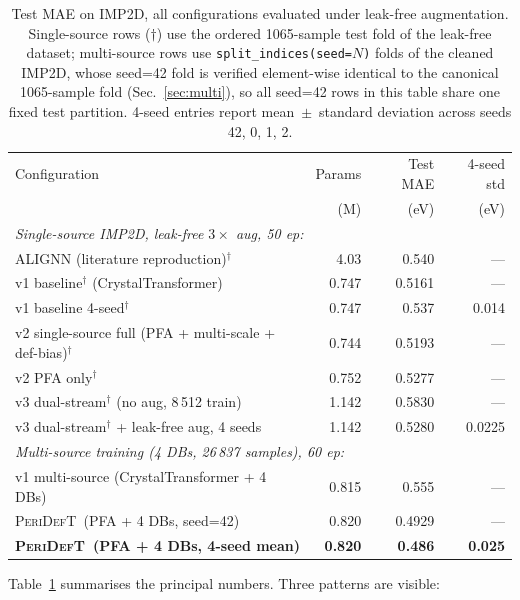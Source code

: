 \documentclass[11pt,a4paper]{article}
\newcommand{\modelname}{\textsc{PeriDefT}}
\begin{document}
\begin{table}[t]
\centering
\caption{Test MAE on IMP2D, all configurations evaluated under
leak-free augmentation. Single-source rows ($\dagger$) use the
ordered 1065-sample test fold of the leak-free dataset; multi-source
rows use \texttt{split\_indices(seed=$N$)} folds of the cleaned
IMP2D, whose seed=42 fold is verified element-wise identical to the
canonical 1065-sample fold (Sec.~\ref{sec:multi}), so all seed=42
rows in this table share one fixed test partition. 4-seed entries
report mean~$\pm$~standard deviation across seeds 42, 0, 1, 2.}
\label{tab:headline}
\begin{tabular}{lrrr}
\toprule
Configuration & Params & Test MAE & 4-seed std \\
& (M) & (eV) & (eV) \\
\midrule
\multicolumn{4}{l}{\emph{Single-source IMP2D, leak-free $3\times$ aug, 50 ep:}} \\
ALIGNN (literature reproduction)$^\dagger$
                    & 4.03 & 0.540 & --- \\
v1 baseline$^\dagger$ (CrystalTransformer)
                    & 0.747 & 0.5161 & --- \\
v1 baseline 4-seed$^\dagger$
                    & 0.747 & 0.537 & 0.014 \\
v2 single-source full (PFA + multi-scale + def-bias)$^\dagger$
                    & 0.744 & 0.5193 & --- \\
v2 PFA only$^\dagger$
                    & 0.752 & 0.5277 & --- \\
v3 dual-stream$^\dagger$ (no aug, 8\,512 train)
                    & 1.142 & 0.5830 & --- \\
v3 dual-stream$^\dagger$ + leak-free aug, 4 seeds
                    & 1.142 & 0.5280 & 0.0225 \\
\midrule
\multicolumn{4}{l}{\emph{Multi-source training (4 DBs, 26\,837 samples), 60 ep:}} \\
v1 multi-source (CrystalTransformer + 4 DBs)
                    & 0.815 & 0.555 & --- \\
\modelname\ (PFA + 4 DBs, seed=42)
                    & 0.820 & 0.4929 & --- \\
\textbf{\modelname\ (PFA + 4 DBs, 4-seed mean)}
                    & \textbf{0.820} & \textbf{0.486} & \textbf{0.025} \\
\bottomrule
\end{tabular}
\end{table}

Table~\ref{tab:headline} summarises the principal numbers. Three
patterns are visible:
\end{document}
